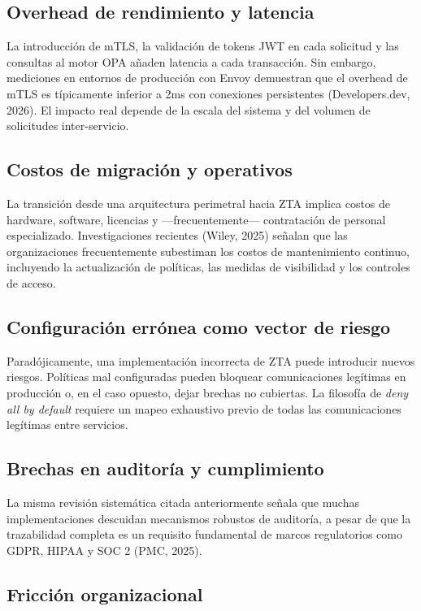 \documentclass[12pt,a4paper]{article}
\begin{document}
\subsection{Overhead de rendimiento y latencia}

La introducción de mTLS, la validación de tokens JWT en cada solicitud y las consultas al motor OPA añaden latencia a cada transacción. Sin embargo, mediciones en entornos de producción con Envoy demuestran que el overhead de mTLS es típicamente inferior a 2ms con conexiones persistentes (Developers.dev, 2026). El impacto real depende de la escala del sistema y del volumen de solicitudes inter-servicio.

\subsection{Costos de migración y operativos}

La transición desde una arquitectura perimetral hacia ZTA implica costos de hardware, software, licencias y —frecuentemente— contratación de personal especializado. Investigaciones recientes (Wiley, 2025) señalan que las organizaciones frecuentemente subestiman los costos de mantenimiento continuo, incluyendo la actualización de políticas, las medidas de visibilidad y los controles de acceso.

\subsection{Configuración errónea como vector de riesgo}

Paradójicamente, una implementación incorrecta de ZTA puede introducir nuevos riesgos. Políticas mal configuradas pueden bloquear comunicaciones legítimas en producción o, en el caso opuesto, dejar brechas no cubiertas. La filosofía de \textit{deny all by default} requiere un mapeo exhaustivo previo de todas las comunicaciones legítimas entre servicios.

\subsection{Brechas en auditoría y cumplimiento}

La misma revisión sistemática citada anteriormente señala que muchas implementaciones descuidan mecanismos robustos de auditoría, a pesar de que la trazabilidad completa es un requisito fundamental de marcos regulatorios como GDPR, HIPAA y SOC 2 (PMC, 2025).

\subsection{Fricción organizacional}
\end{document}
